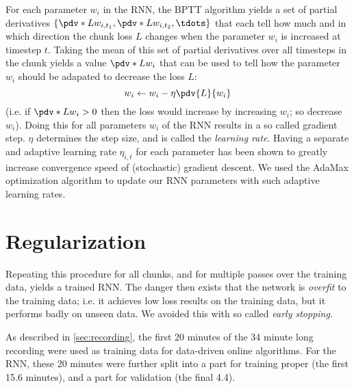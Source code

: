 For each parameter $w_i$ in the RNN, the BPTT algorithm yields a set of partial derivatives $\{ \pdv*{L}{w_{i,t_1}}, \pdv*{L}{w_{i,t_2}}, \tdots \}$ that each tell how much and in which direction the chunk loss $L$ changes when the parameter $w_i$ is increased at timestep $t$. Taking the mean of this set of partial derivatives over all timesteps in the chunk yields a value $\pdv*{L}{w_i}$ that can be used to tell how the parameter $w_i$ should be adapated to decrease the loss $L$:
%
\begin{equation}
\label{eq:SGD}
w_i \leftarrow w_i - \eta \pdv{L}{w_i}
\end{equation}
%
(i.e. if $\pdv*{L}{w_i} > 0$ then the loss would increase by increasing $w_i$; so decrease $w_i$). Doing this for all parameters $w_i$ of the RNN results in a so called gradient step. $\eta$ determines the step size, and is called the \emph{learning rate}. Having a separate and adaptive learning rate $\eta_{i,t}$ for each parameter has been shown to greatly increase convergence speed of (stochastic) gradient descent. We used the AdaMax optimization algorithm \cite{Kingma2014} to update our RNN parameters with such adaptive learning rates.



\section{Regularization}
\label{sec:regularize}

Repeating this procedure for all chunks, and for multiple passes over the training data, yields a trained RNN. The danger then exists that the network is \emph{overfit} to the training data; i.e. it achieves low loss results on the training data, but it performs badly on unseen data. We avoided this with so called \emph{early stopping}.

As described in \cref{sec:recording}, the first 20 minutes of the 34 minute long recording were used as training data for data-driven online algorithms. For the RNN, these 20 minutes were further split into a part for training proper (the first 15.6 minutes), and a part for validation (the final 4.4).


